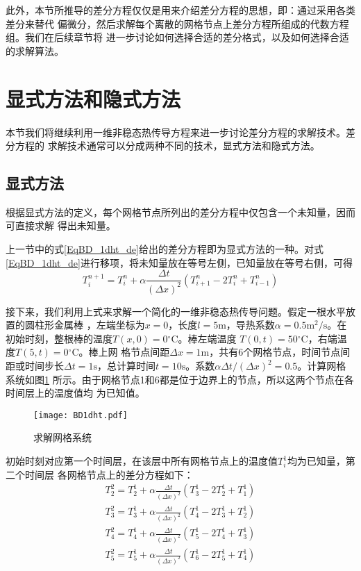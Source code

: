 此外，本节所推导的差分方程仅仅是用来介绍差分方程的思想，即：通过采用各类差分来替代
偏微分，然后求解每个离散的网格节点上差分方程所组成的代数方程组。我们在后续章节将
进一步讨论如何选择合适的差分格式，以及如何选择合适的求解算法。

\section{显式方法和隐式方法}
本节我们将继续利用一维非稳态热传导方程来进一步讨论差分方程的求解技术。差分方程的
求解技术通常可以分成两种不同的技术，显式方法和隐式方法。

\subsection{显式方法}
根据显式方法的定义，每个网格节点所列出的差分方程中仅包含一个未知量，因而可直接求解
得出未知量。

上一节中的式\eqref{EqBD_1dht_de}给出的差分方程即为显式方法的一种。对式
\eqref{EqBD_1dht_de}进行移项，将未知量放在等号左侧，已知量放在等号右侧，可得
\begin{equation}
  T_{i}^{n+1}
  =
  T_{i}^{n}
  +
  \alpha\frac{\Delta t}{(\Delta x)^{2}}
  \left(
    T_{i+1}^{n} - 2T_{i}^{n} + T_{i-1}^{n}
  \right)
\end{equation}

接下来，我们利用上式来求解一个简化的一维非稳态热传导问题。假定一根水平放置的圆柱形金属棒
，左端坐标为$x=0$，长度$l=5\mathrm{m}$，导热系数$\alpha=0.5\mathrm{m^{2}/s}$。在
初始时刻，整根棒的温度$T(x,0)=0\mathrm{^{\circ}\!C}$。棒左端温度
$T(0,t)=50\mathrm{^{\circ}\!C}$，右端温度$T(5,t)=0\mathrm{^{\circ}\!C}$。棒上网
格节点间距$\Delta x=1\mathrm{m}$，共有6个网格节点，时间节点间距或时间步长$\Delta
t=1\mathrm{s}$，总计算时间$t=10\mathrm{s}$。系数$\alpha\Delta t/(\Delta
x)^{2}=0.5$。计算网格系统如图\ref{FgBD_1dht_grid}
所示。由于网格节点1和6都是位于边界上的节点，所以这两个节点在各时间层上的温度值均
为已知值。
\begin{figure}[h]
  \centering
  \texttt{[image: BD1dht.pdf]}
  \caption{求解网格系统}
  \label{FgBD_1dht_grid}
\end{figure}

初始时刻对应第一个时间层，在该层中所有网格节点上的温度值$T_{i}^{1}$均为已知量，第二个时间层
各网格节点上的差分方程如下：
\begin{equation}
\begin{aligned}
  T_{2}^{2} = 
  T_{2}^{1} 
  +
  \alpha\frac{\Delta t}{(\Delta x)^{2}}
  (T_{3}^{1}-2T_{2}^{1}+T_{1}^{1})
  \\
  T_{3}^{2} = 
  T_{3}^{1} 
  +
  \alpha\frac{\Delta t}{(\Delta x)^{2}}
  (T_{4}^{1}-2T_{3}^{1}+T_{2}^{1})
\\
  T_{4}^{2} = 
  T_{4}^{1} 
  +
  \alpha\frac{\Delta t}{(\Delta x)^{2}}
  (T_{5}^{1}-2T_{4}^{1}+T_{3}^{1})
  \\
  T_{5}^{2} = 
  T_{5}^{1} 
  +
  \alpha\frac{\Delta t}{(\Delta x)^{2}}
  (T_{6}^{1}-2T_{5}^{1}+T_{4}^{1})
\end{aligned}
\end{equation}

